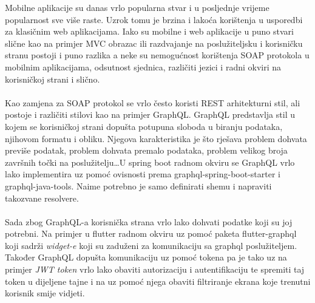 \documentclass[times, utf8, zavrsni]{fer}
\begin{document}
\begin{sazetak}
      Mobilne aplikacije su danas vrlo popularna stvar i u posljednje vrijeme popularnost sve više raste.
      Uzrok tomu je brzina i lakoća korištenja u usporedbi za klasičnim web aplikacijama. Iako su mobilne
      i web aplikacije u puno stvari slične kao na primjer MVC obrazac ili razdvajanje na poslužiteljsku i
      korisničku stranu postoji i puno razlika a neke su nemogućnost korištenja SOAP protokola u mobilnim
      aplikacijama, odsutnost sjednica, različiti jezici i radni okviri na korisničkoj strani i slično.
      \\\\
      Kao zamjena za SOAP protokol se vrlo često koristi REST arhitekturni stil, ali postoje i različiti
      stilovi kao na primjer GraphQL. GraphQL predstavlja stil u kojem se korisničkoj strani dopušta
      potupuna sloboda u biranju podataka, njihovom formatu i obliku. Njegova karakteristika je što
      rješava problem dohvata previše podatak, problem dohvata premalo podataka, problem velikog broja
      završnih točki na poslužitelju\dots U spring boot radnom okviru se GraphQL vrlo lako implementira uz
      pomoć ovisnosti prema graphql-spring-boot-starter i graphql-java-tools. Naime potrebno je samo definirati
      shemu i napraviti takozvane resolvere.
      \\\\
      Sada zbog GraphQL-a korisnička strana vrlo lako dohvati podatke koji su joj potrebni. Na primjer
      u flutter radnom okviru uz pomoć paketa flutter-graphql koji sadrži \textit{widget-e} koji su
      zaduženi za komunikaciju sa graphql poslužiteljem. Također GraphQL dopušta komunikaciju uz pomoć tokena
      pa je tako uz na primjer \textit{JWT token} vrlo lako obaviti autorizaciju i autentifikaciju te spremiti
      taj token u dijeljene tajne i na uz pomoć njega obaviti filtriranje ekrana koje trenutni korisnik smije
      vidjeti.
      \\\\
      \\\\\\\\
\end{sazetak}
\end{document}
